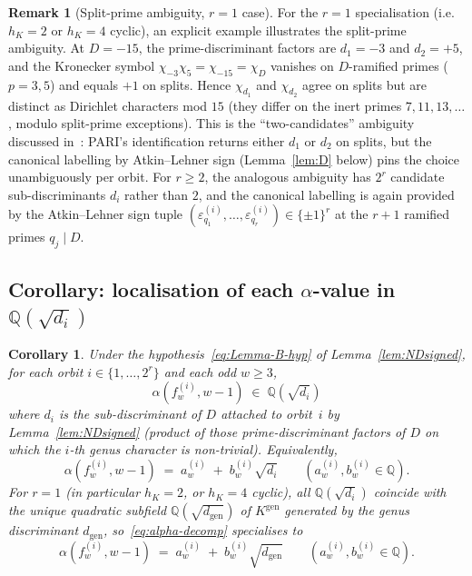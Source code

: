 \documentclass[11pt,a4paper]{amsart}
\theoremstyle{plain}
\newtheorem{corollary}[theorem]{Corollary}
\theoremstyle{definition}
\newtheorem{remark}[theorem]{Remark}
\newcommand{\Q}{\mathbb{Q}}
\newcommand{\Kgen}{K^{\mathrm{gen}}}
\newcommand{\fl}[2]{f_{#1}^{(#2)}}
\newcommand{\dgen}{d_{\mathrm{gen}}}
\begin{document}
\begin{remark}[Split-prime ambiguity, $r = 1$ case]\label{rk:Bsplit-amb}
For the $r = 1$ specialisation (i.e.~$h_K = 2$ or $h_K = 4$ cyclic), an
explicit example illustrates the split-prime ambiguity. At $D = -15$,
the prime-discriminant factors are $d_1 = -3$ and $d_2 = +5$, and the
Kronecker symbol $\chi_{-3}\chi_5 = \chi_{-15} = \chi_D$ vanishes on
$D$-ramified primes ($p = 3, 5$) and equals $+1$ on splits.  Hence
$\chi_{d_1}$ and $\chi_{d_2}$ agree on splits but are distinct as
Dirichlet characters mod $15$ (they differ on the inert primes $7, 11,
13, \ldots$, modulo split-prime exceptions).  This is the
``two-candidates'' ambiguity discussed in~\cite[\S
2.3]{Remondiere2026ND}: PARI's identification returns either $d_1$ or
$d_2$ on splits, but the canonical labelling by Atkin--Lehner sign
(Lemma~\ref{lem:D} below) pins the choice unambiguously per orbit. For
$r \ge 2$, the analogous ambiguity has $2^r$ candidate sub-discriminants
$d_i$ rather than $2$, and the canonical labelling is again provided by
the Atkin--Lehner sign tuple $(\varepsilon_{q_1}^{(i)}, \ldots,
\varepsilon_{q_r}^{(i)}) \in \{\pm 1\}^r$ at the $r+1$ ramified primes
$q_j \mid D$.
\end{remark}

\subsection*{Corollary: localisation of each $\alpha$-value in
$\Q(\sqrt{d_i})$}\label{ss:lemma-B-cor}

\begin{corollary}\label{cor:alpha-loc}
Under the hypothesis~\eqref{eq:Lemma-B-hyp} of
Lemma~\ref{lem:NDsigned}, for each orbit
$i \in \{1, \ldots, 2^r\}$ and each odd $w \ge 3$,
\[
   \alpha(\fl{w}{i}, w{-}1) \;\in\; \Q(\sqrt{d_i})
\]
where $d_i$ is the sub-discriminant of $D$ attached to orbit~$i$ by
Lemma~\ref{lem:NDsigned} (product of those prime-discriminant factors of
$D$ on which the $i$-th genus character is non-trivial).  Equivalently,
\begin{equation}\label{eq:alpha-decomp}
   \alpha(\fl{w}{i}, w-1) \;=\; a_w^{(i)} \;+\; b_w^{(i)} \sqrt{d_i}
   \qquad (a_w^{(i)}, b_w^{(i)} \in \Q).
\end{equation}
For $r = 1$ (in particular $h_K = 2$, or $h_K = 4$ cyclic), all
$\Q(\sqrt{d_i})$ coincide with the unique quadratic subfield
$\Q(\sqrt{\dgen})$ of $\Kgen$ generated by the genus discriminant
$\dgen$, so~\eqref{eq:alpha-decomp} specialises to
\begin{equation}\label{eq:alpha-decomp-gen}
   \alpha(\fl{w}{i}, w-1) \;=\; a_w^{(i)} \;+\; b_w^{(i)}\sqrt{\dgen}
   \qquad (a_w^{(i)}, b_w^{(i)} \in \Q).
\end{equation}
\end{corollary}
\end{document}

